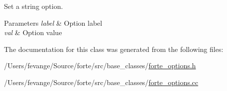 Set a string option. 


\begin{DoxyParams}{Parameters}
{\em label} & Option label \\
\hline
{\em val} & Option value \\
\hline
\end{DoxyParams}


The documentation for this class was generated from the following files\+:\begin{DoxyCompactItemize}
\item 
/\+Users/fevange/\+Source/forte/src/base\+\_\+classes/\mbox{\hyperlink{forte__options_8h}{forte\+\_\+options.\+h}}\item 
/\+Users/fevange/\+Source/forte/src/base\+\_\+classes/\mbox{\hyperlink{forte__options_8cc}{forte\+\_\+options.\+cc}}\end{DoxyCompactItemize}
